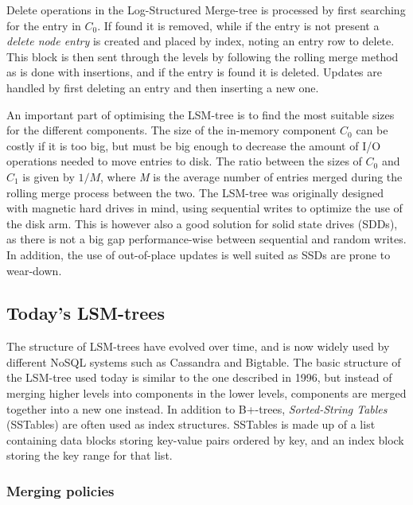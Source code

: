 \noindent
Delete operations in the Log-Structured Merge-tree is processed by first searching for the entry in $C_0$. If found it is removed, while if the entry is not present a \emph{delete node entry} is created and placed by index, noting an entry row to delete. This block is then sent through the levels by following the rolling merge method as is done with insertions, and if the entry is found it is deleted. Updates are handled by first deleting an entry and then inserting a new one.
\newline

\noindent
An important part of optimising the LSM-tree is to find the most suitable sizes for the different components. The size of the in-memory component $C_0$ can be costly if it is too big, but must be big enough to decrease the amount of I/O operations needed to move entries to disk. The ratio between the sizes of $C_0$ and $C_1$ is given by $1/M$, where \emph{M} is the average number of entries merged during the rolling merge process between the two. The LSM-tree was originally designed with magnetic hard drives in mind, using sequential writes to optimize the use of the disk arm. This is however also a good solution for solid state drives (SDDs), as there is not a big gap performance-wise between sequential and random writes. In addition, the use of out-of-place updates is well suited as SSDs are prone to wear-down\cite{LSMSDD}.

\subsection{Today's LSM-trees}
The structure of LSM-trees have evolved over time, and is now widely used by different NoSQL systems such as Cassandra\cite{Cassandra} and Bigtable\cite{Bigtable}. The basic structure of the LSM-tree used today is similar to the one described in 1996\cite{LSMTree}, but instead of merging higher levels into components in the lower levels, components are merged together into a new one instead\cite{LSMSurvey}. In addition to B+-trees, \emph{Sorted-String Tables} (SSTables) are often used as index structures. SSTables is made up of a list containing data blocks storing key-value pairs ordered by key, and an index block storing the key range for that list. 

\subsubsection{Merging policies}

